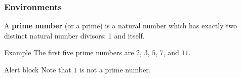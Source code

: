 \documentclass[pdflatex,compress,mathserif]{beamer}
\begin{document}
\begin{frame}
\frametitle{Environments}

\begin{definition}
A \textbf{prime number} (or a prime) is a natural number which has exactly two distinct natural number divisors: 1 and itself.
\end{definition}

\begin{exampleblock}{Example}
The first five prime numbers are $2$, $3$, $5$, $7$, and $11$.
\end{exampleblock}

\begin{alertblock}{Alert block}
Note that $1$ is not a prime number.
\end{alertblock}

\end{frame}
\end{document}
